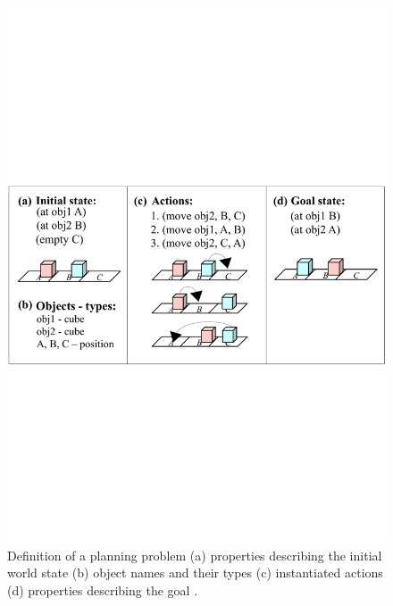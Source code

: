 \begin{figure}
	\centering
	\includegraphics[width=\linewidth]{Fig1.pdf}
	\caption{Definition of a planning problem (a) properties describing the initial world state (b) object names and their types (c) instantiated actions (d) properties describing the goal \cite{liang2017b}.}
	\label{fig:planning-permutation}
\end{figure}

